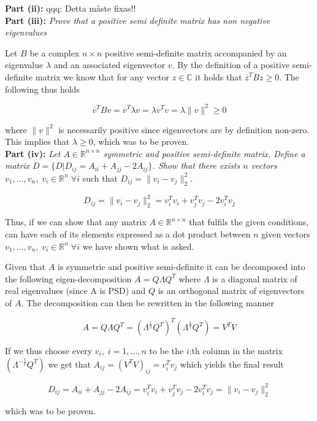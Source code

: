 \textbf{Part (ii):} qqq: Detta måste fixas!!
\\

\textbf{Part (iii):} \textit{Prove that a positive semi definite matrix has non negative eigenvalues}

Let $B$ be a complex $n \times n$ positive semi-definite matrix accompanied by an eigenvalue $\lambda$ and an associated eigenvector $v$. By the definition of a positive semi-definite matrix we know that for any vector $z \in \mathbb{C}$ it holds that $\overline{z}^T B z \geq 0$. The following thus holds

\begin{equation}
  \overline{v}^T B v = \overline{v}^T \lambda v = \lambda \overline{v}^T v = \lambda \lVert v \rVert^2 \geq 0
  \label{iii_1}
\end{equation}

where $\lVert v \rVert^2$ is necessarily positive since eigenvectors are by definition non-zero. This implies that $\lambda \geq 0$, which was to be proven.
\\

\textbf{Part (iv):} \textit{Let $A \in \mathbb{R}^{n \times n}$ symmetric and positive semi-definite matrix. Define a matrix $D = \{ D | D_{ij} = A_{ii} + A_{jj} - 2A_{ij} \}$. Show that there exists $n$ vectors $v_1, ..., v_n, \; v_i \in \mathbb{R}^n \; \forall i$} such that $D_{ij} = \lVert v_i - v_j \rVert^2_2$.

\begin{equation}
  D_{ij} = \lVert v_i - v_j \rVert^2_2 = v_i^T v_i + v_j^T v_j - 2v_i^T v_j
\end{equation}

Thus, if we can show that any matrix $A \in \mathbb{R}^{n \times n}$ that fulfils the given conditions, can have each of its elements expressed as a dot product between $n$ given vectors $v_1, ..., v_n, \; v_i \in \mathbb{R}^n \; \forall i$ we have shown what is asked.

Given that $A$ is symmetric and positive semi-definite it can be decomposed into the following eigen-decomposition $A = Q \Lambda Q^T$ where $\Lambda$ is a diagonal matrix of real eigenvalues (since A is PSD) and $Q$ is an orthogonal matrix of eigenvectors of $A$. The decomposition can then be rewritten in the following manner

\begin{equation}
  A = Q \Lambda Q^T = (\Lambda^{\frac{1}{2}} Q^T)^T (\Lambda^{\frac{1}{2}} Q^T) = V^T V
\end{equation}

If we thus choose every $v_i, \; i = 1 ,..., n$ to be the $i$:th column in the matrix $(\Lambda^{-\frac{1}{2}} Q^T)$ we get that $A_{ij} = (V^T V)_{ij} = v_i^T v_j$ which yields the final result

\begin{equation}
  D_{ij} = A_{ii} + A_{jj} - 2A_{ij} = v_i^T v_i + v_j^T v_j - 2v_i^T v_j = \lVert v_i - v_j \rVert^2_2
\end{equation}

which was to be proven.

